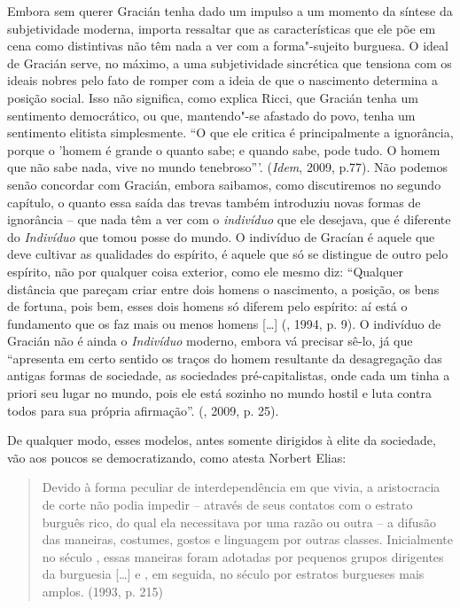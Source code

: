 Embora sem querer Gracián tenha dado um impulso a um momento da síntese
da subjetividade moderna, importa ressaltar que as características que
ele põe em cena como distintivas não têm nada a ver com a forma"-sujeito
burguesa. O ideal de Gracián serve, no máximo, a uma subjetividade
sincrética que tensiona com os ideais nobres pelo fato de romper com a
ideia de que o nascimento determina a posição social. Isso não
significa, como explica Ricci, que Gracián tenha um sentimento
democrático, ou que, mantendo"-se afastado do povo, tenha um sentimento
elitista simplesmente. ``O que ele critica é principalmente a
ignorância, porque o 'homem é grande o quanto sabe; e quando sabe, pode
tudo. O homem que não sabe nada, vive no mundo tenebroso'''.
(\emph{Idem}, 2009, p.77). Não podemos senão concordar com Gracián,
embora saibamos, como discutiremos no segundo capítulo, o quanto essa
saída das trevas também introduziu novas formas de ignorância -- que
nada têm a ver com o \emph{indivíduo} que ele desejava, que é diferente
do \emph{Indivíduo} que tomou posse do mundo. O indivíduo de Gracían é
aquele que deve cultivar as qualidades do espírito, é aquele que só se
distingue de outro pelo espírito, não por qualquer coisa exterior, como
ele mesmo diz: ``Qualquer distância que pareçam criar entre dois homens
o nascimento, a posição, os bens de fortuna, pois bem, esses dois homens
só diferem pelo espírito: aí está o fundamento que os faz mais ou menos
homens [\ldots{}] (, 1994, p. 9). O indivíduo de Gracián não
é ainda o \emph{Indivíduo} moderno, embora vá precisar sê-lo, já que
``apresenta em certo sentido os traços do homem resultante da
desagregação das antigas formas de sociedade, as sociedades
pré-capitalistas, onde cada um tinha a priori seu lugar no mundo, pois
ele está sozinho no mundo hostil e luta contra todos para sua própria
afirmação''. (, 2009, p. 25).

De qualquer modo, esses modelos, antes somente dirigidos à elite da
sociedade, vão aos poucos se democratizando, como atesta Norbert Elias:

\begin{quote}
Devido à forma peculiar de interdependência em que vivia, a aristocracia
de corte não podia impedir -- através de seus contatos com o estrato
burguês rico, do qual ela necessitava por uma razão ou outra -- a
difusão das maneiras, costumes, gostos e linguagem por outras classes.
Inicialmente no século , essas maneiras foram adotadas por pequenos
grupos dirigentes da burguesia [\ldots{}] e , em seguida, no século
 por estratos burgueses mais amplos. (1993, p. 215)
\end{quote}

